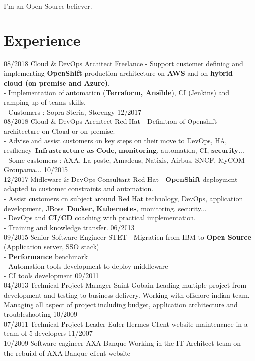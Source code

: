 \documentclass[]{friggeri-cv}
\begin{document}
 \vspace{-4pt}
 \qquad  I'm an Open Source believer.  
\section{Experience}
\setlength{\parsepsave}{\parsep}%
\setlength{\parsep}{8.0pt}%
\begin{entrylist}	
	\entryDate
		{08/2018 }
		{Cloud \& DevOps Architect}
		{Freelance}
		{
			- Support customer defining and implementing \textbf{OpenShift} production architecture on \textbf{AWS} and on \textbf{hybrid cloud (on premise and Azure)}.  \\
			- Implementation of automation (\textbf{Terraform, Ansible}), CI (Jenkins) and ramping up of teams skills.  \\	
		 - Customers : Sopra Steria, Storengy
		}
	\entryDate
		{12/2017 \\ 08/2018 }
		{Cloud \& DevOps Architect}
		{Red Hat}
		{	
			- Definition of Openshift architecture on Cloud or on premise. \\
			- Advise and assist customers on key steps on their move to DevOps, HA, resiliency, \textbf{Infrastructure as Code}, \textbf{monitoring}, automation, CI, \textbf{security}... \\
			- Some customers : AXA, La poste, Amadeus, Natixis, Airbus, SNCF, MyCOM Groupama...    
		}
	\entryDate
		{10/2015 \\ 12/2017}
		{Midleware \& DevOps Consultant}
		{Red Hat}
		{ 
			- \textbf{OpenShift} deployment adapted to customer constraints and automation. \\ 
			- Assist customers on subject around Red Hat technology, DevOps, application development, JBoss, \textbf{Docker, Kubernetes}, monitoring, security... \\ 
			- DevOps and \textbf{CI/CD} coaching with practical implementation. \\ 
			- Training and knowledge transfer.
		}	
	\entryDate
	 	{06/2013 \\  09/2015}
		{Senior Software Engineer}
		{STET}
		{ 
			- Migration from IBM to \textbf{Open Source} (Application server, SSO stack)			\\
			- \textbf{Performance} benchmark \\ 
		 	- Automation tools development to deploy middleware \\
		 	- CI tools development 
	 	} 
	\entryDate
		{09/2011 \\ 04/2013}
		{Technical Project Manager}
		{Saint Gobain}
		{
			Leading multiple project from development and testing to business delivery. Working with offshore indian team. Managing all aspect of project including budget, application architecture and troubleshooting }
	\entryDate
		{10/2009 \\ 07/2011}    
		{Technical Project Leader}
		{Euler Hermes}
		{Client website maintenance in a team of 5 developers }
	\entryDate
		{11/2007 \\ 10/2009}
		{Software engineer}
		{AXA Banque}
		{Working in the IT Architect team on the rebuild of AXA Banque client website}
	\end{entrylist}
\end{document}
